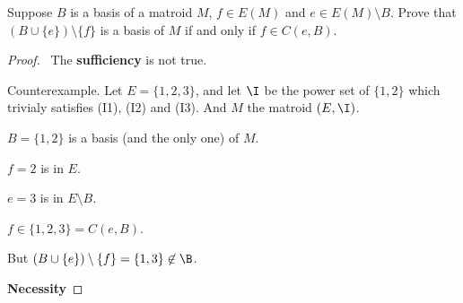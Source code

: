 \prob
{
    Suppose $B$ is a basis of a matroid $M$, $f \in E(M)$ and $e \in E(M) \setminus B$.
    Prove that $(B\cup \{e\}) \setminus \{ f \}$ is a basis of $M$ if and only if $f \in C(e, B)$.
}
\begin{proof}$\,$\pn
    The \textbf{sufficiency} is not true.\pn
    
    Counterexample. Let $E = \{1, 2, 3\}$, and let $\I$ be the power set of $\{1, 2\}$ which trivialy
    satisfies (I1), (I2) and (I3). And $M$ the matroid $(E, \I)$.\pn
    
    $B = \{1, 2\}$ is a basis (and the only one) of $M$.
    
    $f = 2$ is in $E$.
    
    $e = 3$ is in $E \setminus B$.
    
    $f \in \{1, 2, 3\} = C(e, B)$.
    
    But $(B \cup \{ e \}) \setminus \{ f \} = \{1, 3\} \not\in \B$.\pn
    
    \textbf{Necessity}
    
\end{proof}